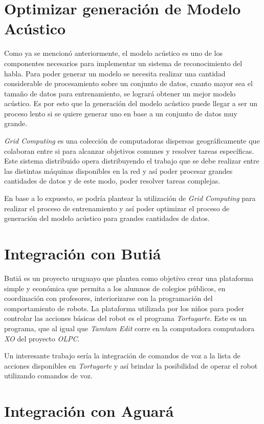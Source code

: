 \section{Optimizar generaci\'on de Modelo Ac\'ustico}

Como ya se mencion\'o anteriormente, el modelo ac\'ustico es uno de los componentes necesarios para implementar un sistema de 
reconocimiento del habla. Para poder generar un modelo se necesita realizar una cantidad considerable de procesamiento sobre
un conjunto de datos, cuanto mayor sea el tama\~no de datos para entrenamiento, se lograr\'a obtener un mejor modelo ac\'ustico. Es por
esto que la generaci\'on del modelo ac\'ustico puede llegar a ser un proceso lento si se quiere generar uno en base a un conjunto de datos
muy grande.

\emph{Grid Computing} es una colecci\'on de computadoras dispersas geogr\'aficamente que colaboran entre si para alcanzar objetivos comunes y resolver
tareas espec\'ificas. Este sistema distribuido opera distribuyendo el trabajo que se debe realizar entre las distintas m\'aquinas disponibles en la red
y as\'i poder procesar grandes cantidades de datos y de este modo, poder resolver tareas complejas.

En base a lo expuesto, se podr\'ia plantear la utilizaci\'on de \emph{Grid Computing} para realizar el proceso de entrenamiento y as\'i
poder optimizar el proceso de generaci\'on del modelo ac\'ustico para grandes cantidades de datos.

\section{Integraci\'on con Buti\'a}

Buti\'a es un proyecto uruguayo que plantea como objetivo crear una plataforma simple y econ\'omica que permita a los alumnos de colegios p\'ublicos,
en coordinaci\'on con profesores, interiorizarse con la programaci\'on del comportamiento de robots\cite{Butia}. La plataforma
utilizada por los ni\~nos para poder controlar las acciones b\'asicas del robot es el programa \emph{Tortugarte}. Este es un
programa, que al igual que \emph{Tamtam Edit} corre en la computadora computadora \emph{XO} del proyecto \emph{OLPC}.

Un interesante trabajo ser\'ia la integraci\'on de comandos de voz a la lista de acciones disponibles en \emph{Tortugarte} y
as\'i brindar la posibilidad de operar el robot utilizando comandos de voz.

\section{Integraci\'on con Aguar\'a}

